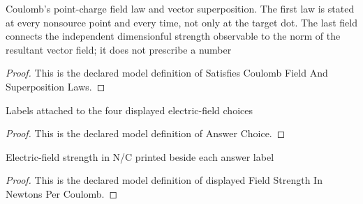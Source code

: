 \begin{definition}
  \label{def:physics:phyx-mini-0832:phyxminiproblems-problemphyxmini0832-satisfiescoulombfieldandsuperpositionlaws}
  Coulomb's point-charge field law and vector superposition. The first law is stated at every nonsource point and every time, not only at the target dot. The last field connects the independent dimensionful strength observable to the norm of the resultant vector field; it does not prescribe a number
\end{definition}
\begin{proof}
  This is the declared model definition of Satisfies Coulomb Field And Superposition Laws.
\end{proof}
\begin{definition}
  \label{def:physics:phyx-mini-0832:phyxminiproblems-problemphyxmini0832-answerchoice}
  Labels attached to the four displayed electric-field choices
\end{definition}
\begin{proof}
  This is the declared model definition of Answer Choice.
\end{proof}
\begin{definition}
  \label{def:physics:phyx-mini-0832:phyxminiproblems-problemphyxmini0832-displayedfieldstrengthinnewtonspercoulomb}
  Electric-field strength in N/C printed beside each answer label
\end{definition}
\begin{proof}
  This is the declared model definition of displayed Field Strength In Newtons Per Coulomb.
\end{proof}
